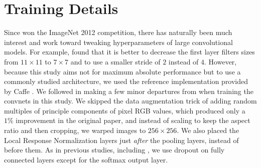 
\appendix



\section{Training Details}

Since \cite{Krizhevsky-2012} won the ImageNet 2012 competition, there has naturally been much interest and work toward tweaking hyperparameters of large convolutional models. For example, \cite{Zeiler+et+al-arxiv2013b} found that it is better to decrease the first layer filters sizes from $11\times 11$ to $7\times 7$ and to use a smaller stride of $2$ instead of $4$.
However, because this study aims not for maximum absolute performance but to use 
a commonly studied architecture, we used the reference implementation provided by Caffe \citep{jia2014caffe:-convolutional-architecture}.
We followed \citet{donahue+jia-2013-arxiv} in making a few minor departures from \cite{Krizhevsky-2012} when training the convnets in this study. We skipped the data augmentation trick of adding random multiples of principle components of pixel RGB values, which produced only a $1\%$ improvement in the original paper, and instead of scaling to keep the aspect ratio and then cropping, we warped images to $256\times 256$. We also placed the Local Response Normalization layers just \emph{after} the pooling layers, instead of before them. As in previous studies, including \cite{Krizhevsky-2012}, we use dropout \citep{Hinton-et-al-arxiv2012} on fully connected layers except for the softmax output layer.


